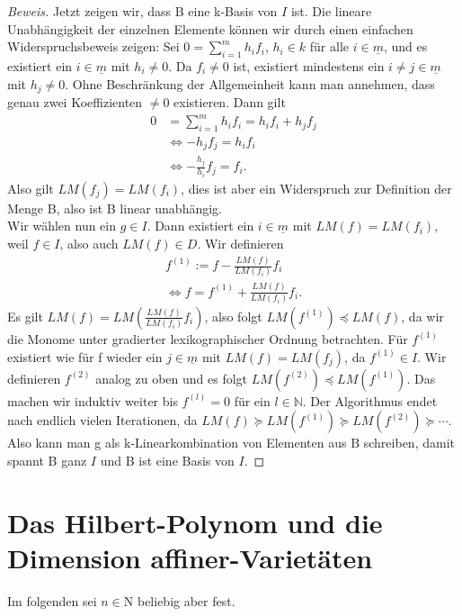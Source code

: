 \documentclass{article}
\begin{document}
\begin{proof}[Beweis]
	Jetzt zeigen wir, dass B eine k-Basis von \(I\) ist. Die lineare Unabhängigkeit der einzelnen 
	Elemente können wir durch einen einfachen Widerspruchsbeweis zeigen:
	Sei \(0 = \sum_{i=1}^{m} h_{i}f_{i}\), \(h_{i} \in k\) für alle \(i \in \underline{m}\),
	und es existiert ein \(i \in \underline{m}\) mit \(h_{i} \neq 0\).
	Da \(f_{i} \neq 0\) ist, existiert mindestens ein \(i \neq j \in \underline
	{m}\) mit \(h_{j} \neq 0\). Ohne Beschränkung der Allgemeinheit kann man annehmen, dass genau
	zwei Koeffizienten \(\neq 0\) existieren. Dann gilt
	\begin{align*}
		0 &= \sum_{i=1}^{m} h_{i}f_{i} = h_{i}f_{i} + h_{j}f_{j} \\
		&\Leftrightarrow -h_{j}f_{j} = h_{i}f_{i} \\
		&\Leftrightarrow -\frac{h_{j}}{h_{i}} f_{j} = f_{i}.
	\end{align*}
	Also gilt \(LM(f_{j}) = LM(f_{i})\), dies ist aber ein Widerspruch zur Definition der Menge B,
	also ist B linear unabhängig. \\
	Wir wählen nun ein \(g \in I\). Dann existiert ein \(i \in \underline{m}\) mit \(LM(f) =
	LM(f_{i})\), weil \(f \in I\), also auch \(LM(f) \in D\). Wir definieren
	\begin{align*}
		f^{(1)} := f - \frac{LM(f)}{LM(f_{i})}f_{i} \\
		\Leftrightarrow f = f^{(1)} + \frac{LM(f)}{LM(f_{i})}f_{i}.
	\end{align*}
	Es gilt \(LM(f) = LM(\frac{LM(f)}{LM(f_{i})}f_{i})\), also folgt \(LM(f^{(1)}) \preceq LM(f)\),
	da wir die Monome unter gradierter lexikographischer Ordnung betrachten.
	Für \(f^{(1)}\) existiert wie für f wieder ein \(j \in \underline{m}\) mit \(LM(f) =
	LM(f_{j})\), da \(f^{(1)} \in I\). Wir definieren \(f^{(2)}\) analog zu oben und es
	folgt \(LM(f^{(2)}) \preceq LM(f^{(1)})\). Das machen wir induktiv weiter bis \(f^{(l)} = 0\)  
	für ein \(l \in \mathbb{N}\).
	Der Algorithmus endet nach endlich vielen Iterationen, da \(LM(f) \succeq LM(f^{(1)}) \succeq LM(f^{(2)}) \succeq \cdots\).
	Also kann man g als k-Linearkombination von Elementen aus B schreiben, damit spannt B ganz \(I\) und B ist eine Basis von \(I\).
	\end{proof}

\section{Das Hilbert-Polynom und die Dimension affiner-Varietäten}

Im folgenden sei $n \in \mathrm{N}$ beliebig aber fest.
\end{document}
